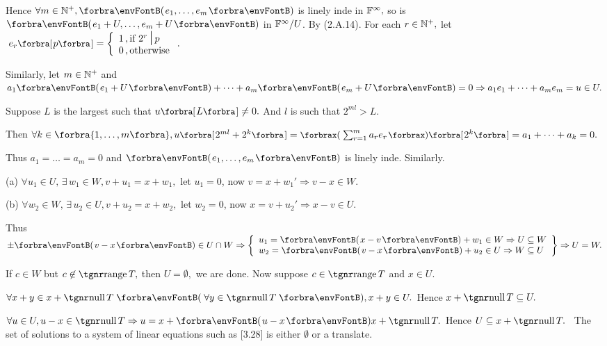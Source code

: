 \documentclass[a4paper, 11pt, UTF8]{article}
\begin{document}
\begin{large}
Hence $\forall m\in\Nbp,\Par{e_1,\dots,e_m}$ is linely inde in ${\mathbb{F}}^{\infty},$ so is $\Par{e_1+U,\dots,e_m+U}$ in ${\mathbb{F}}^{\infty}/U$. By (2.A.14).\PfEnd\vspace{14pt}\quad
\Or For each $r\in{\mathbb{N}^+},$ let $\;e_r\Sbra{p}=\hMath[0pt]{l}{\left\{}{\right.}{1\,,\text{if }2^r\,\mid\,p\\0\,,\text{otherwise}}.$\vspace{4pt}\par\quad
Similarly, let $m\in{\mathbb{N}^+}$ and $a_1\Par{e_1+U}+\dots+a_m\Par{e_m+U}=0\Rightarrow a_1e_1+\dots+a_me_m=u\in U.$\vspace{4pt}\par\quad
Suppose $L$ is the largest such that $u\Sbra{L}\neq 0.$ And $l$ is such that $2^{ml}> L.$\vspace{6pt}\par\quad
Then $\forall k\in\Bra{1,\dots,m},u\Sbra{2^{ml}+2^k}=\XPar{\sum_{r=1}^m a_re_r}\Sbra{2^k}=a_1+\dots+a_k=0.$\vspace{6pt}\par\quad
Thus $a_1=\dots=a_m=0$ and $\Par{e_1,\dots,e_m}$ is linely inde. Similarly.\PfEnd
\SepLine

\par\quad
(a) $\forall u_1\in U,\,\exists\,w_1\in W,v+u_1=x+w_1,$ let $u_1=0$, now $v=x+w_1'\Rightarrow v-x\in W$.\par\quad
(b) $\forall w_2\in W,\,\exists\,u_2\in U,v+u_2=x+w_2,$ let $w_2=0$, now $x=v+u_2'\Rightarrow x-v\in U$.\par\quad
Thus $\pm\Par{v-x}\in U\cap W \Rightarrow\MathLeftrightBrace{l}{u_1=\Par{x-v}+w_1\in W\Rightarrow U\subseteq W\\w_2=\Par{v-x}+u_2\in U\Rightarrow W\subseteq U}\Rightarrow U=W.$\PfEnd
\SepLine

\SepLine

\par\quad
If $c\in W$ but $c\not\in\range T,$ then $U=\emptyset,$ we are done. Now suppose $c\in\range T$ and $x\in U.$\vspace{0pt}\par\quad
$\forall x+y\in x+\null T\;\Par{\,\forall y\in\null T\,},x+y\in U.$ Hence $x+\null T\subseteq U.$\vspace{0pt}\par\quad
$\forall u\in U,u-x\in\null T\Rightarrow u=x+\Par{u-x} x+\null T.$ Hence $U\subseteq x+\null T.$\PfEnd
\Corollary \,\,\,{\tgsl The set of solutions to a system of linear equations such as [3.28] is either $\emptyset$ or a translate.}\par
\SepLine


\end{large}
\end{document}
